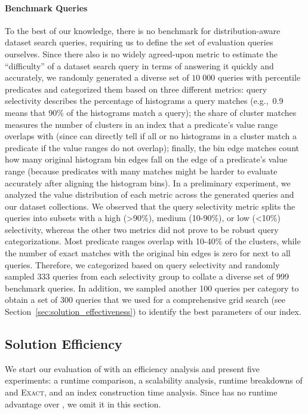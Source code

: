 \paragraph{Benchmark Queries}
To the best of our knowledge, there is no benchmark for dis\-tri\-bu\-tion-aware dataset search queries, requiring us to define the set of evaluation queries ourselves.
Since there also is no widely agreed-upon metric to estimate the ``difficulty'' of a dataset search query in terms of answering it quickly and accurately, we randomly generated a diverse set of $10\;000$ queries with percentile predicates and categorized them based on three different metrics:
query selectivity describes the percentage of histograms a query matches (e.g.,~0.9 means that 90\% of the histograms match a query);
the share of cluster matches measures the number of clusters in an index that a predicate's value range overlaps with (since \system{} can directly tell if all or no histograms in a cluster match a predicate if the value ranges do not overlap);
finally, the bin edge matches count how many original histogram bin edges fall on the edge of a predicate's value range (because predicates with many matches might be harder to evaluate accurately after aligning the histogram bins).
In a preliminary experiment, we analyzed the value distribution of each metric across the generated queries and our dataset collections.
We observed that the query selectivity metric splits the queries into subsets with a high (>90\%), medium (10-90\%), or low (<10\%) selectivity, whereas the other two metrics did not prove to be robust query categorizations.
Most predicate ranges overlap with 10-40\% of the clusters, while the number of exact matches with the original bin edges is zero for next to all queries.
Therefore, we categorized based on query selectivity and randomly sampled 333 queries from each selectivity group to collate a diverse set of 999 benchmark queries.
In addition, we sampled another 100 queries per category to obtain a set of 300 queries that we used for a comprehensive grid search (see Section~\ref{sec:solution_effectiveness}) to identify the best parameters of our index.


\subsection{Solution Efficiency}
\label{sec:solution_efficiency}

We start our evaluation of \system{} with an efficiency analysis and present five experiments: a runtime comparison, a scalability analysis, runtime breakdowns of \approximate{} and \textsc{Exact}, and an index construction time analysis.
Since \ndist has no runtime advantage over \pscan, we omit it in this section.

